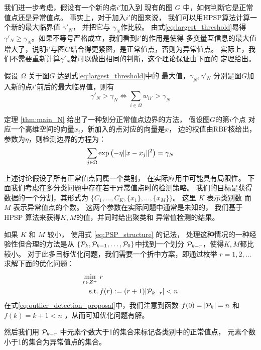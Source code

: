 我们进一步考虑，假设有一个新的点$i'$加入到
现有的图 $G$ 中，如何判断它是正常值点还是异常值点。 
事实上，对于加入$i'$的图来说，
我们可以用HPSP算法计算一个新的最大临界值
$\gamma'_N$，
并把它与 $\gamma_N$作比较。 由式\eqref{eq:largest_threshold}易得
$\gamma'_N \geq \gamma_N$。如果不等号严格成立，我们看到$i'$的作用是使得
多变量互信息的最大值增大了，说明$i'$与图$G$结合得更紧密，是正常值点，否则为异常值点。
实际上，我们不需要重新计算$\gamma'_N$就可以做出相同的判断，这个理论保证由下面的
定理给出。
\begin{theorem}\label{thm:main_N}
  假设 $\Omega$ 关于图$G$ 达到式\eqref{eq:largest_threshold}中的
  最大值，$\gamma_N, \gamma'_N$ 分别是图$G$加入新的点$i'$前后的最大临界值，则有
\begin{equation}
\gamma'_N > \gamma_N \iff  \sum_{i \in \Omega} w_{ii'} > \gamma_N 
\end{equation}
\end{theorem}
定理 \ref{thm:main_N} 给出了一种划分正常值点边界的方法，
假设图$G$的第$i$个点
对应一个高维空间的向量$x_i$，新加入的点对应的向量是$x$，
边的权值由RBF核给出，参数为$\eta$，则检测边界的方程为：
\begin{equation}\label{eq:sum_exp_gamma_N}
  \sum_{j \in \Omega} \exp\left(-\eta \norm{x - x_j}^2 \right)= \gamma_N
\end{equation}

上述讨论假设了所有正常值点同属一个类别，
在实际应用中可能具有局限性。
下面我们考虑在多分类问题中存在若干异常值点时的检测策略。
我们的目标是获得数据的一个分割，其形式为
$\{C_1, \dots, C_K, \{x_1\}, \dots, \{x_M\}\}$。
这里 $K$ 表示类别数 而 $M$ 表示异常值点的个数。
这两个参数在实际问题中通常是未知的，
我们基于 HPSP 算法来获得$K, M$的值，并同时给出聚类和
异常值检测的结果。

如果 $K$ 和 $M$ 较小， 使用式 \eqref{eq:PSP_structure}
的记法， 处理这种情况的一种经验性但合理的方法是从
$\{\P_k, \P_{k-1}, \dots, \P_0\}$中找到一个划分
$\P_{k-r}$，使得$K,M$都比较小。
对于此多目标优化问题，我们需要一个折中方案，即通过枚举
$r=1,2,\dots$ 求解下面的优化问题：
\begin{align}\label{eq:outlier_detection_proposal}
 \min_{r\in Z^+} \ &r \\
\textrm{s.t.}\, & f(r):=(r+1)\abs{\P_{k-r}} < n \notag
\end{align}
在式\eqref{eq:outlier_detection_proposal}中，我们注意到函数
$f(0)=|\P_k|=n$ 和 $f(k)=k+1<n$ ，从而可知优化问题有解。

然后我们用 $\P_{k-r}$ 中元素个数大于1的集合来标记各类别中的正常值点，
元素个数小于1的集合为异常值点的集合。

